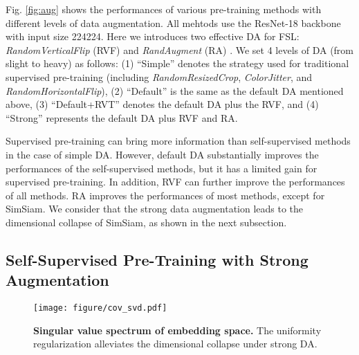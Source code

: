 \documentclass[runningheads]{llncs}
\begin{document}
Fig. \ref{fig:aug} shows the performances of various pre-training methods with different levels of data augmentation. All mehtods use the ResNet-18 backbone with input size 224224. 
Here we introduces two effective DA for FSL: \textit{RandomVerticalFlip} (RVF) and \textit{RandAugment} (RA) \cite{cubuk2020randaugment}.
We set 4 levels of DA (from slight to heavy) as follows: (1) ``Simple'' denotes the strategy used for traditional supervised pre-training (including \textit{RandomResizedCrop}, \textit{ColorJitter}, and \textit{RandomHorizontalFlip}), (2) ``Default'' is the same as the default DA mentioned above, (3) ``Default+RVT'' denotes the default DA plus the RVF, and (4) ``Strong'' represents the default DA plus RVF and RA.

Supervised pre-training can bring more information than self-supervised methods in the case of simple DA. 
However, default DA substantially improves the performances of the self-supervised methods, but it has a limited gain for supervised pre-training. 
In addition, RVF can further improve the performances of all methods.
RA improves the performances of most methods, except for SimSiam.
We consider that the strong data augmentation leads to the dimensional collapse of SimSiam, as shown in the next subsection.


\subsection{Self-Supervised Pre-Training with Strong Augmentation}
\label{sec:exp_ssl}

\begin{figure}[t]
\centering
\begin{minipage}[c]{0.3\textwidth}
        \texttt{[image: figure/cov\_svd.pdf]} 
\end{minipage}\hfill
\begin{minipage}[c]{0.65\textwidth}
	\caption{\textbf{Singular value spectrum of embedding space.} The uniformity regularization alleviates the dimensional collapse under strong DA. } 
	\label{fig:svd}
\end{minipage}
\end{figure}
\end{document}
